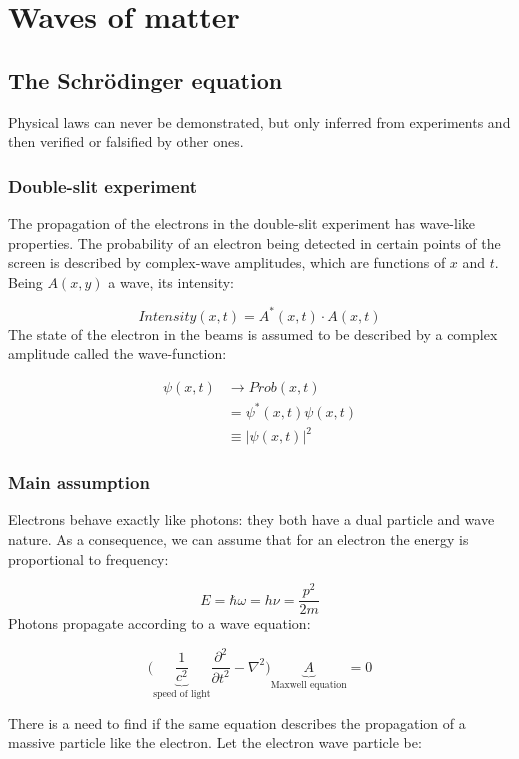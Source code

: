 \graphicspath{{chapters/03/}}
\chapter{Waves of matter}

\section{The Schr\"odinger equation}
Physical laws can never be demonstrated, but only inferred from experiments and then verified or falsified by other ones.


  \subsection{Double-slit experiment}
  The propagation of the electrons in the double-slit experiment has wave-like properties.
  The probability of an electron being detected in certain points of the screen is described by complex-wave amplitudes, which are functions of $x$ and $t$. Being $A(x,y)$ a wave, its intensity:

  $$Intensity(x,t) = A^*(x,t)\cdot A(x,t)$$
\noindent
  The state of the electron in the beams is assumed to be described by a complex amplitude called the wave-function:

  \begin{align*}
    \psi(x,t) &\rightarrow Prob(x,t)\\
              &=\psi^*(x,t)\psi(x,t)\\
              &\equiv |\psi(x,t)|^2
  \end{align*}

  \subsection{Main assumption}
  Electrons behave exactly like photons: they both have a dual particle and wave nature.
  As a consequence, we can assume that for an electron the energy is proportional to frequency:

  $$E = \hbar\omega = h\nu = \frac{p^2}{2m}$$
\noindent
  Photons propagate according to a wave equation:

  $$\biggl(\underbrace{\frac{1}{c^2}}_{\text{speed of light}}\frac{\partial^2{}}{\partial{t^2}} - \nabla^2\biggr)\underbrace{A}_{\text{Maxwell equation}} = 0$$

\noindent
  There is a need to find if the same equation describes the propagation of a massive particle like the electron.
  Let the electron wave particle be:

